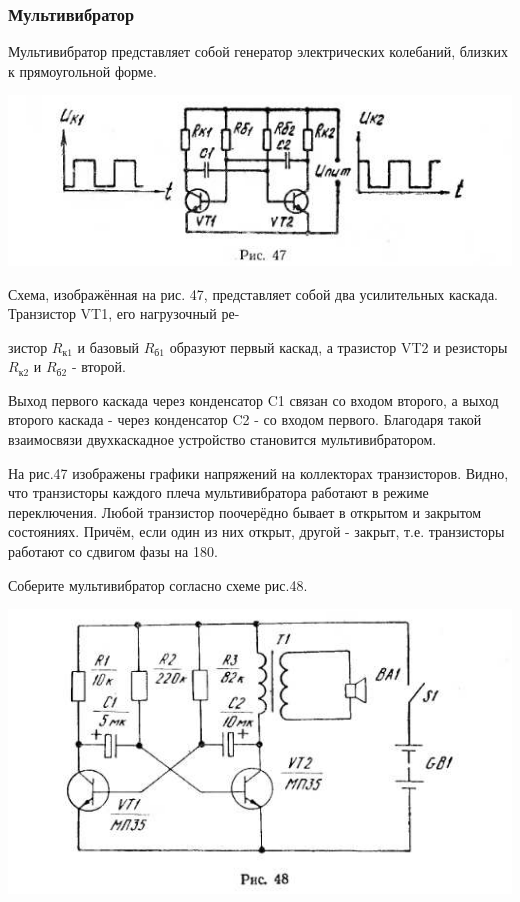 \documentclass[12pt]{article}
\begin{document}
\hrulefill

\subsubsection{Мультивибратор}

Мультивибратор представляет собой генератор электрических колебаний, близких к прямоугольной форме.

\hspace*{0.7cm}\includegraphics[scale=0.9, angle=0]{ekon3_047_2}

Схема, изображённая на рис. 47, представляет собой два усилительных каскада. Транзистор VT1, его нагрузочный ре-

\newpage
зистор $R_{\text{к1}}$ и базовый $R_{\text{б1}}$ образуют первый каскад, а тразистор VT2 и резисторы $R_{\text{к2}}$ и $R_{\text{б2}}$ - второй.

Выход первого каскада через конденсатор C1 связан со входом второго, а выход второго каскада - через конденсатор C2 - со входом первого. Благодаря такой взаимосвязи двухкаскадное устройство становится мультивибратором.

На рис.47 изображены графики напряжений на коллекторах транзисторов. Видно, что транзисторы каждого плеча мультивибратора работают в режиме переключения. Любой транзистор поочерёдно бывает в открытом и закрытом состояниях. Причём, если один из них открыт, другой - закрыт, т.е. транзисторы работают со сдвигом фазы на 180\textdegree.

Соберите мультивибратор согласно схеме рис.48.

\hspace*{0.7cm}\includegraphics[scale=0.9, angle=0]{ekon3_048_1}
\end{document}
